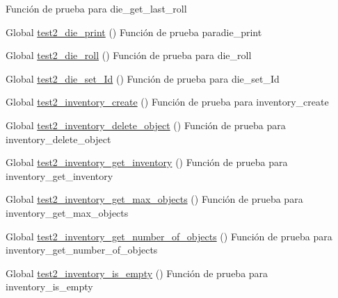 \begin{DoxyRefList}
%
Función de prueba para die\+\_\+get\+\_\+last\+\_\+roll  
\item[Global \mbox{\hyperlink{die__test_8c_a5bf5f30b38f256efc0c6e91ef538f5f1}{test2\+\_\+die\+\_\+print}} ()]\label{test__test000063}%
%
Función de prueba paradie\+\_\+print  
\item[Global \mbox{\hyperlink{die__test_8c_af7df60d905acf9505f1e434c6f75d027}{test2\+\_\+die\+\_\+roll}} ()]\label{test__test000054}%
%
Función de prueba para die\+\_\+roll  
\item[Global \mbox{\hyperlink{die__test_8c_aba25cb59703baaefe0072882b847925d}{test2\+\_\+die\+\_\+set\+\_\+\+Id}} ()]\label{test__test000056}%
%
Función de prueba para die\+\_\+set\+\_\+\+Id  
\item[Global \mbox{\hyperlink{inventory__test_8c_a73a6080c360a8870c4ffc734e989c8b3}{test2\+\_\+inventory\+\_\+create}} ()]\label{test__test000066}%
%
Función de prueba para inventory\+\_\+create  
\item[Global \mbox{\hyperlink{inventory__test_8c_a7df95a4c69353ae9bf0766e3d13672f8}{test2\+\_\+inventory\+\_\+delete\+\_\+object}} ()]\label{test__test000081}%
%
Función de prueba para inventory\+\_\+delete\+\_\+object  
\item[Global \mbox{\hyperlink{inventory__test_8c_a800414ee6d964ee2424534f14a4dbda9}{test2\+\_\+inventory\+\_\+get\+\_\+inventory}} ()]\label{test__test000076}%
%
Función de prueba para inventory\+\_\+get\+\_\+inventory  
\item[Global \mbox{\hyperlink{inventory__test_8c_ac75954611acab583f780145532ab3197}{test2\+\_\+inventory\+\_\+get\+\_\+max\+\_\+objects}} ()]\label{test__test000100}%
%
Función de prueba para inventory\+\_\+get\+\_\+max\+\_\+objects  
\item[Global \mbox{\hyperlink{inventory__test_8c_afb66a921e4bd9b8df05b0c2fcbbc9649}{test2\+\_\+inventory\+\_\+get\+\_\+number\+\_\+of\+\_\+objects}} ()]\label{test__test000074}%
%
Función de prueba para inventory\+\_\+get\+\_\+number\+\_\+of\+\_\+objects  
\item[Global \mbox{\hyperlink{inventory__test_8c_a4d2a2a4d4ba59446d013debfe9bf05dc}{test2\+\_\+inventory\+\_\+is\+\_\+empty}} ()]\label{test__test000086}%
%
Función de prueba para inventory\+\_\+is\+\_\+empty  

\end{DoxyRefList}
